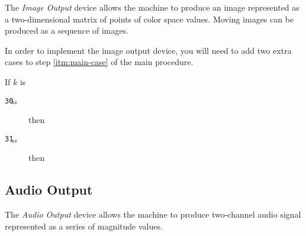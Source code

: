\documentclass[a4paper,12pt]{article}
\newcommand{\num}[1]{\texttt{#1}\xspace}
\newcommand{\hex}[1]{\num{#1}$_{\textup{\tiny\hskip-1ex 16}}$\xspace}
\newcommand{\op}[1]{#1}
\newcommand{\NEWFRAME}  [1]{\op{\hex{30}}}
\newcommand{\SETPIXEL}  [1]{\op{\hex{31}}}
\begin{document}
The \emph{Image Output} device allows the machine to produce an image represented as a two-dimensional matrix of points of color space values.
Moving images can be produced as a sequence of images.

In order to implement the image output device, you will need to add two extra cases to step \ref{itm:main-case} of the main procedure.

\begin{stepnumbers}[start=3]
\item If $k$ is
  \begin{description}
  \item[\NEWFRAME{}] then
  \item[\SETPIXEL{}] then
  \end{description}
\end{stepnumbers}

\subsection{Audio Output}

The \emph{Audio Output} device allows the machine to produce two-channel audio signal represented as a series of magnitude values.
\end{document}
